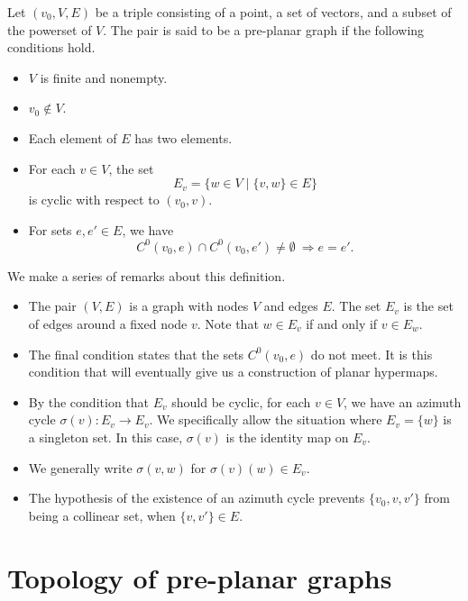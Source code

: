 \begin{definition}  Let $(v_0,V,E)$ be a triple consisting of a point,
a set of
vectors, and a subset of the powerset of $V$.  The pair is said to be
a pre-planar graph if the following conditions hold.
    \begin{itemize}
    \item $V$ is finite and nonempty.
    \item $v_0\not\in V$.
    \item Each element of $E$ has two elements.
    \item For each $v\in V$, the set
        $$
        E_v = \{w\in V\mid \{v,w\}\in E\}
        $$
        is cyclic with respect to $(v_0,v)$.
    \item For sets $e,e'\in E$,   we have
        $$C^0(v_0,e) \cap C^0(v_0,e')\ne\emptyset\ \Rightarrow e = e'.$$
    \end{itemize}
\end{definition}

We make a series of remarks about this definition.

\begin{remark}
\begin{itemize}
\item The pair $(V,E)$ is a graph with nodes $V$ and edges $E$.  The set
$E_v$ is the set of edges around a fixed node $v$.
Note that $w\in E_v$ if and only if $v\in E_w$.   
%
\item The final condition states that the sets $C^0(v_0,e)$
do not meet.   It
is this condition that will eventually give us a construction of planar
hypermaps.
%
\item
By the condition that $E_v$ should be cyclic,
for each $v\in V$, we have an azimuth cycle $\sigma(v):E_v\to E_v$.
We specifically allow the situation where $E_v = \{w\}$ is a
singleton set. In this case,
$\sigma(v)$ is the identity map on $E_v$.
%
\item
We generally write $\sigma(v,w)$ for $\sigma(v)(w)\in E_v$.
%
\item 
The hypothesis of the existence of an azimuth cycle
prevents $\{v_0,v,v'\}$ from being a collinear set, when $\{v,v'\}\in
E$.
%
\end{itemize}
\end{remark}



\section{Topology of pre-planar graphs}

